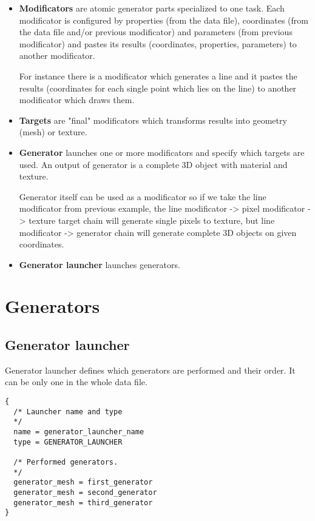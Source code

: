 \documentclass[9pt]{article}
\begin{document}
\begin{itemize}
\item{\bf Modificators} are atomic generator parts specialized to one task. 
Each modificator is configured by properties (from the data file), 
coordinates (from the data file and/or previous modificator) and 
parameters (from previous modificator) and pastes its results 
(coordinates, properties, parameters) to another modificator.

For instance there is a modificator which generates a line and it 
pastes the results (coordinates for each single point which lies on the line) 
to another modificator which draws them.

\item{\bf Targets} are "final" modificators which transforms 
results into geometry (mesh) or texture. 

\item{\bf Generator} launches one or more modificators and 
specify which targets are used. An output of generator is 
a complete 3D object with material and texture. 

Generator itself can be used as a modificator so
if we take the line modificator from previous example, 
the line modificator -> pixel modificator -> texture target chain will 
generate single pixels to texture, but line modificator -> generator 
chain will generate complete 3D objects on given coordinates.

\item{\bf Generator launcher} launches generators.

\end{itemize}

\section{Generators}

\subsection{Generator launcher}
Generator launcher defines which generators are performed and their order. 
It can be only one in the whole data file.
\begin{verbatim}
{
  /* Launcher name and type
  */
  name = generator_launcher_name
  type = GENERATOR_LAUNCHER

  /* Performed generators. 
  */
  generator_mesh = first_generator
  generator_mesh = second_generator
  generator_mesh = third_generator
}
\end{verbatim}
\end{document}
